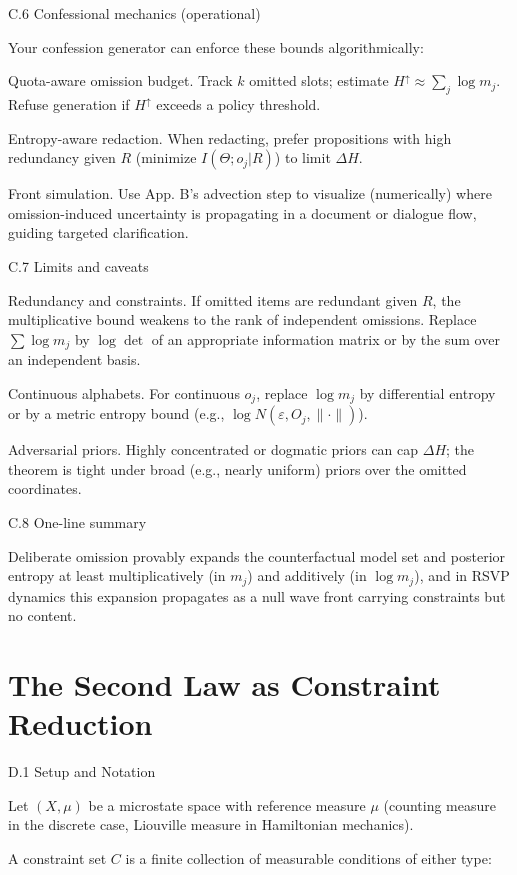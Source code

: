 \documentclass[11pt,a4paper]{article}
\begin{document}
C.6 Confessional mechanics (operational)

Your confession generator can enforce these bounds algorithmically:

Quota-aware omission budget. Track $k$ omitted slots; estimate $H^\uparrow \approx \sum_j \log m_j$. Refuse generation if $H^\uparrow$ exceeds a policy threshold.

Entropy-aware redaction. When redacting, prefer propositions with high redundancy given $R$ (minimize $I(\Theta ; o_j | R)$) to limit $\Delta H$.

Front simulation. Use App. B’s advection step to visualize (numerically) where omission-induced uncertainty is propagating in a document or dialogue flow, guiding targeted clarification.

C.7 Limits and caveats

Redundancy and constraints. If omitted items are redundant given $R$, the multiplicative bound weakens to the rank of independent omissions. Replace $\sum \log m_j$ by $\log \det$ of an appropriate information matrix or by the sum over an independent basis.

Continuous alphabets. For continuous $o_j$, replace $\log m_j$ by differential entropy or by a metric entropy bound (e.g., $\log N(\varepsilon, O_j, \|\cdot\|)$).

Adversarial priors. Highly concentrated or dogmatic priors can cap $\Delta H$; the theorem is tight under broad (e.g., nearly uniform) priors over the omitted coordinates.

C.8 One-line summary

Deliberate omission provably expands the counterfactual model set and posterior entropy at least multiplicatively (in $m_j$) and additively (in $\log m_j$), and in RSVP dynamics this expansion propagates as a null wave front carrying constraints but no content.

\section{The Second Law as Constraint Reduction}
\label{app:d}

D.1 Setup and Notation

Let $(X, \mu)$ be a microstate space with reference measure $\mu$ (counting measure in the discrete case, Liouville measure in Hamiltonian mechanics).

A constraint set $C$ is a finite collection of measurable conditions of either type:
\end{document}
